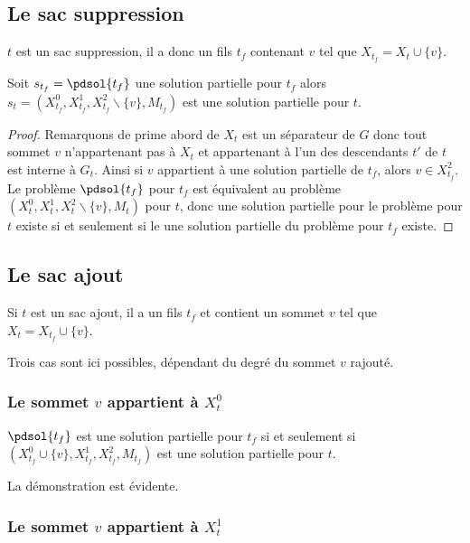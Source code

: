\subsection{Le sac suppression}

$t$ est un sac suppression, il a donc un fils $t_f$ contenant $v$ tel que $X_{t_f} = X_t \cup
\{v\}$. 
\begin{nlemma}
    Soit $s_{t_f} = \pdsol{t_f}$ une solution partielle pour $t_f$ alors $s_t = (X_{t_f}^0, X_{t_f}^1,
    X_{t_f}^2\backslash\{v\}, M_{t_f})$ est une solution partielle pour $t$.
\end{nlemma}

\begin{proof}
    Remarquons de prime abord de $X_t$ est un séparateur de $G$ donc tout sommet $v$ n'appartenant
    pas à $X_t$ et appartenant à l'un des descendants $t'$ de $t$ est interne à $G_t$. Ainsi si $v$
    appartient à une solution partielle de $t_f$, alors $v \in X_{t_f}^2$. Le problème $\pdsol{t_f}$ pour
    $t_f$ est équivalent au problème $(X_t^0, X_t^1, X_t^2\backslash\{v\}, M_t)$ pour $t$, donc une
    solution partielle pour le problème pour $t$ existe si et seulement si le une solution partielle
    du problème pour $t_f$ existe.
\end{proof}

\subsection{Le sac ajout}

Si $t$ est un sac ajout, il a un fils $t_f$ et contient un sommet $v$ tel que $X_{t} = X_{t_f} \cup
\{v\}$.

Trois cas sont ici possibles, dépendant du degré du sommet $v$ rajouté.

\subsubsection{Le sommet $v$ appartient à $X_t^0$}

\begin{nlemma}
    $\pdsol{t_f}$ est une solution partielle pour $t_f$ si et seulement si $(X_{t_f}^0 \cup \{v\},
    X_{t_f}^1, X_{t_f}^2, M_{t_f})$ est une solution partielle pour $t$.
\end{nlemma}

La démonstration est évidente.

\subsubsection{Le sommet $v$ appartient à $X_t^1$}

